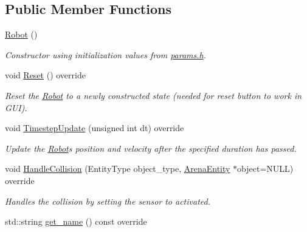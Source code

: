 \subsection*{Public Member Functions}
\begin{DoxyCompactItemize}
\item 
\hyperlink{classRobot_a4fc7c70ae20623f05e06f2ecb388b6c4}{Robot} ()\hypertarget{classRobot_a4fc7c70ae20623f05e06f2ecb388b6c4}{}\label{classRobot_a4fc7c70ae20623f05e06f2ecb388b6c4}

\begin{DoxyCompactList}\small\item\em Constructor using initialization values from \hyperlink{params_8h}{params.\+h}. \end{DoxyCompactList}\item 
void \hyperlink{classRobot_af597fd14927d2cd5308ded62f4e54e29}{Reset} () override\hypertarget{classRobot_af597fd14927d2cd5308ded62f4e54e29}{}\label{classRobot_af597fd14927d2cd5308ded62f4e54e29}

\begin{DoxyCompactList}\small\item\em Reset the \hyperlink{classRobot}{Robot} to a newly constructed state (needed for reset button to work in G\+UI). \end{DoxyCompactList}\item 
void \hyperlink{classRobot_ae790462f8782efcfd26082eedec30ed5}{Timestep\+Update} (unsigned int dt) override
\begin{DoxyCompactList}\small\item\em Update the \hyperlink{classRobot}{Robot}\textquotesingle{}s position and velocity after the specified duration has passed. \end{DoxyCompactList}\item 
void \hyperlink{classRobot_a4fc6b01fec869b559197d8e4b9686249}{Handle\+Collision} (Entity\+Type object\+\_\+type, \hyperlink{classArenaEntity}{Arena\+Entity} $\ast$object=N\+U\+LL) override\hypertarget{classRobot_a4fc6b01fec869b559197d8e4b9686249}{}\label{classRobot_a4fc6b01fec869b559197d8e4b9686249}

\begin{DoxyCompactList}\small\item\em Handles the collision by setting the sensor to activated. \end{DoxyCompactList}\item 
std\+::string \hyperlink{classRobot_a3f77c13705b8f60480d21d8d936dc39e}{get\+\_\+name} () const override\hypertarget{classRobot_a3f77c13705b8f60480d21d8d936dc39e}{}\label{classRobot_a3f77c13705b8f60480d21d8d936dc39e}


\end{DoxyCompactItemize}
